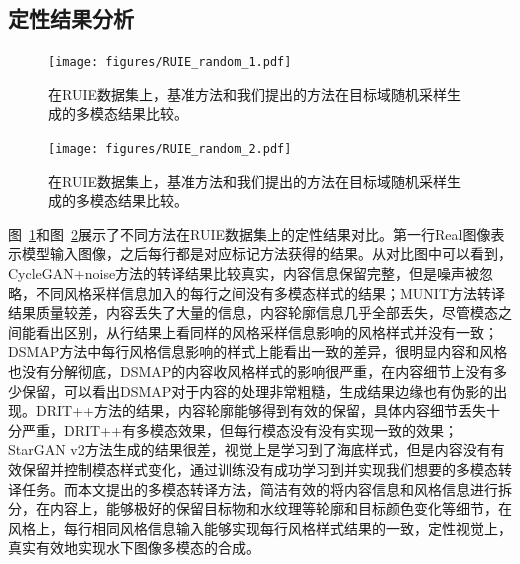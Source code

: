 \subsection{定性结果分析}

\begin{figure}[htp]
    \centering
	\texttt{[image: figures/RUIE\_random\_1.pdf]}
	\caption{在RUIE数据集上，基准方法和我们提出的方法在目标域随机采样生成的多模态结果比较。}
	\label{fig:ruie_random_1}
\end{figure}

\begin{figure}[htp]
    \centering
	\texttt{[image: figures/RUIE\_random\_2.pdf]}
	\caption{在RUIE数据集上，基准方法和我们提出的方法在目标域随机采样生成的多模态结果比较。}
	\label{fig:ruie_random_2}
\end{figure}

图~\ref{fig:ruie_random_1}和图~\ref{fig:ruie_random_2}展示了不同方法在RUIE数据集上的定性结果对比。第一行Real图像表示模型输入图像，之后每行都是对应标记方法获得的结果。从对比图中可以看到，CycleGAN+noise方法的转译结果比较真实，内容信息保留完整，但是噪声被忽略，不同风格采样信息加入的每行之间没有多模态样式的结果；MUNIT方法转译结果质量较差，内容丢失了大量的信息，内容轮廓信息几乎全部丢失，尽管模态之间能看出区别，从行结果上看同样的风格采样信息影响的风格样式并没有一致；DSMAP方法中每行风格信息影响的样式上能看出一致的差异，很明显内容和风格也没有分解彻底，DSMAP的内容收风格样式的影响很严重，在内容细节上没有多少保留，可以看出DSMAP对于内容的处理非常粗糙，生成结果边缘也有伪影的出现。DRIT++方法的结果，内容轮廓能够得到有效的保留，具体内容细节丢失十分严重，DRIT++有多模态效果，但每行模态没有没有实现一致的效果；StarGAN v2方法生成的结果很差，视觉上是学习到了海底样式，但是内容没有有效保留并控制模态样式变化，通过训练没有成功学习到并实现我们想要的多模态转译任务。而本文提出的多模态转译方法，简洁有效的将内容信息和风格信息进行拆分，在内容上，能够极好的保留目标物和水纹理等轮廓和目标颜色变化等细节，在风格上，每行相同风格信息输入能够实现每行风格样式结果的一致，定性视觉上，真实有效地实现水下图像多模态的合成。

